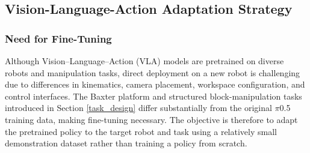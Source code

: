 \documentclass[conference, 12pt]{IEEEtran}
\begin{document}








\subsection{Vision-Language-Action Adaptation Strategy}
\subsubsection{Need for Fine-Tuning}

Although Vision--Language--Action (VLA) models are pretrained on diverse robots and manipulation tasks, direct deployment on a new robot is challenging due to differences in kinematics, camera placement, workspace configuration, and control interfaces. The Baxter platform and structured block-manipulation tasks introduced in Section \ref{task_design} differ substantially from the original $\pi$0.5 training data, making fine-tuning necessary. The objective is therefore to adapt the pretrained policy to the target robot and task using a relatively small demonstration dataset rather than training a policy from scratch.
\end{document}
